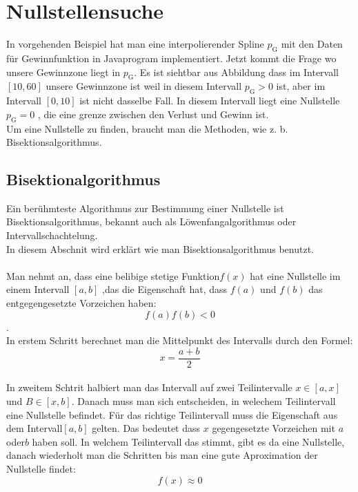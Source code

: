 \section{Nullstellensuche}
In vorgehenden Beispiel hat man eine interpolierender Spline $p_\textrm{G}$ mit den Daten für Gewinnfunktion in Javaprogram implementiert. 
Jetzt kommt die Frage wo unsere Gewinnzone liegt in $p_\textrm{G}$. Es ist siehtbar aus Abbildung %
dass im Intervall $[10,60]$ unsere Gewinnzone ist weil in diesem Intervall  $p_\textrm{G} > 0$ ist, aber  im Intervall  $[0,10]$ ist nicht dasselbe Fall. In diesem Intervall liegt eine Nullstelle  $p_\textrm{G} =0$ , die eine grenze zwischen den Verlust und Gewinn ist.\\
Um eine Nullstelle zu finden, braucht man die Methoden, wie z. b. Bisektionsalgorithmus.

\subsection{Bisektionalgorithmus}
Ein berühmteste Algorithmus zur Bestimmung einer Nullstelle ist Bisektionsalgorithmus, bekannt auch als Löwenfangalgorithmus oder Intervallschachtelung.\\
In diesem Abschnit wird erklärt wie man Bisektionsalgorithmus benutzt.\\
\\
Man nehmt an, dass eine belibige stetige Funktion$f(x)$ hat eine Nullstelle im einem Intervall $[a,b]$ ,das die Eigenschaft hat, dass $f(a)$  und $f(b)$ das entgegengesetzte Vorzeichen haben: $$f(a)f(b)<0$$.\\

In erstem Schritt berechnet man die Mittelpunkt des Intervalls durch den Formel: $$ x=\frac{a + b}{2}$$
\\
In zweitem Schtrit halbiert man das Intervall auf zwei Teilintervalle $x\in[a,x]$ und $ B\in[x,b]$.%
Danach muss man sich entscheiden, in welechem Teilintervall eine Nullstelle befindet. Für das richtige Teilintervall muss die Eigenschaft aus dem Intervall$[a,b]$ gelten.
Das bedeutet dass $x$ gegengesetzte Vorzeichen mit $a$ oder$b$ haben soll. In welchem Teilintervall das stimmt, gibt es da eine Nullstelle, danach wiederholt man die Schritten bis man eine gute Aproximation der Nullstelle findet: $$f(x)\approx 0$$\\
\newpage
